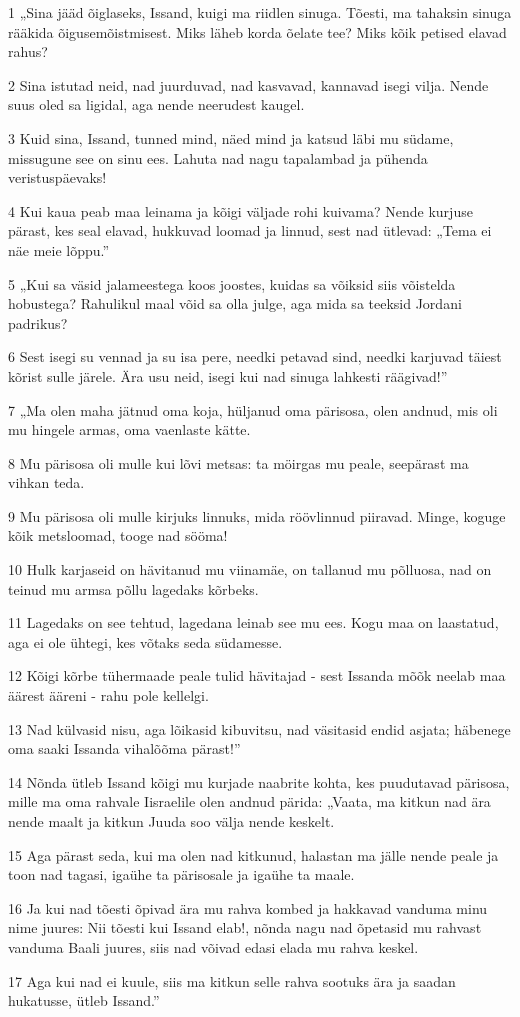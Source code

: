 \par 1 „Sina jääd õiglaseks, Issand, kuigi ma riidlen sinuga. Tõesti, ma tahaksin sinuga rääkida õigusemõistmisest. Miks läheb korda õelate tee? Miks kõik petised elavad rahus?
\par 2 Sina istutad neid, nad juurduvad, nad kasvavad, kannavad isegi vilja. Nende suus oled sa ligidal, aga nende neerudest kaugel.
\par 3 Kuid sina, Issand, tunned mind, näed mind ja katsud läbi mu südame, missugune see on sinu ees. Lahuta nad nagu tapalambad ja pühenda veristuspäevaks!
\par 4 Kui kaua peab maa leinama ja kõigi väljade rohi kuivama? Nende kurjuse pärast, kes seal elavad, hukkuvad loomad ja linnud, sest nad ütlevad: „Tema ei näe meie lõppu.”
\par 5 „Kui sa väsid jalameestega koos joostes, kuidas sa võiksid siis võistelda hobustega? Rahulikul maal võid sa olla julge, aga mida sa teeksid Jordani padrikus?
\par 6 Sest isegi su vennad ja su isa pere, needki petavad sind, needki karjuvad täiest kõrist sulle järele. Ära usu neid, isegi kui nad sinuga lahkesti räägivad!”
\par 7 „Ma olen maha jätnud oma koja, hüljanud oma pärisosa, olen andnud, mis oli mu hingele armas, oma vaenlaste kätte.
\par 8 Mu pärisosa oli mulle kui lõvi metsas: ta möirgas mu peale, seepärast ma vihkan teda.
\par 9 Mu pärisosa oli mulle kirjuks linnuks, mida röövlinnud piiravad. Minge, koguge kõik metsloomad, tooge nad sööma!
\par 10 Hulk karjaseid on hävitanud mu viinamäe, on tallanud mu põlluosa, nad on teinud mu armsa põllu lagedaks kõrbeks.
\par 11 Lagedaks on see tehtud, lagedana leinab see mu ees. Kogu maa on laastatud, aga ei ole ühtegi, kes võtaks seda südamesse.
\par 12 Kõigi kõrbe tühermaade peale tulid hävitajad - sest Issanda mõõk neelab maa äärest ääreni - rahu pole kellelgi.
\par 13 Nad külvasid nisu, aga lõikasid kibuvitsu, nad väsitasid endid asjata; häbenege oma saaki Issanda vihalõõma pärast!”
\par 14 Nõnda ütleb Issand kõigi mu kurjade naabrite kohta, kes puudutavad pärisosa, mille ma oma rahvale Iisraelile olen andnud pärida: „Vaata, ma kitkun nad ära nende maalt ja kitkun Juuda soo välja nende keskelt.
\par 15 Aga pärast seda, kui ma olen nad kitkunud, halastan ma jälle nende peale ja toon nad tagasi, igaühe ta pärisosale ja igaühe ta maale.
\par 16 Ja kui nad tõesti õpivad ära mu rahva kombed ja hakkavad vanduma minu nime juures: Nii tõesti kui Issand elab!, nõnda nagu nad õpetasid mu rahvast vanduma Baali juures, siis nad võivad edasi elada mu rahva keskel.
\par 17 Aga kui nad ei kuule, siis ma kitkun selle rahva sootuks ära ja saadan hukatusse, ütleb Issand.”

